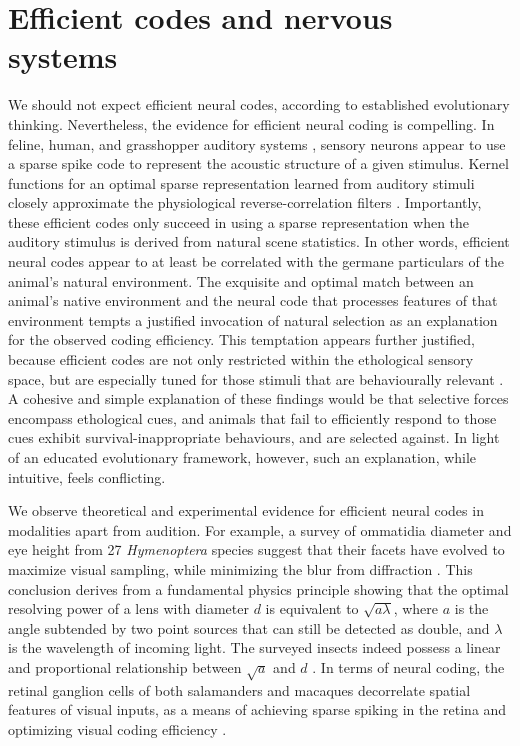 \documentclass{article}
\begin{document}
\section{Efficient codes and nervous systems}

We should not expect efficient neural codes, according to established evolutionary thinking. Nevertheless, the evidence for efficient neural coding is compelling. In feline, human, and grasshopper auditory systems \cite{Machens_Gollisch_Kolesnikova_Herz_2005, smith_lewicki_2006}, sensory neurons appear to use a sparse spike code to represent the acoustic structure of a given stimulus. Kernel functions for an optimal sparse representation learned from auditory stimuli closely approximate the physiological reverse-correlation filters \cite{smith_lewicki_2006}. Importantly, these efficient codes only succeed in using a sparse representation when the auditory stimulus is derived from natural scene statistics. In other words, efficient neural codes appear to at least be correlated with the germane particulars of the animal's natural environment. The exquisite and optimal match between an animal's native environment and the neural code that processes features of that environment tempts a justified invocation of natural selection as an explanation for the observed coding efficiency. This temptation appears further justified, because efficient codes are not only restricted within the ethological sensory space, but are especially tuned for those stimuli that are behaviourally relevant \cite{Machens_Gollisch_Kolesnikova_Herz_2005, machens_herz_2001}. A cohesive and simple explanation of these findings would be that selective forces encompass ethological cues, and animals that fail to efficiently respond to those cues exhibit survival-inappropriate behaviours, and are selected against. In light of an educated evolutionary framework, however, such an explanation, while intuitive, feels conflicting.

We observe theoretical and experimental evidence for efficient neural codes in modalities apart from audition. For example, a survey of ommatidia diameter and eye height from 27 \textit{Hymenoptera} species suggest that their facets have evolved to maximize visual sampling, while minimizing the blur from diffraction \cite{barlow_1952}. This conclusion derives from a fundamental physics principle showing that the optimal resolving power of a lens with diameter $d$ is equivalent to $\sqrt{a \lambda}$, where $a$ is the angle subtended by two point sources that can still be detected as double, and $\lambda$ is the wavelength of incoming light. The surveyed insects indeed possess a linear and proportional relationship between $\sqrt{a}$ and $d$ \cite{barlow_1952}. In terms of neural coding, the retinal ganglion cells of both salamanders and macaques decorrelate spatial features of visual inputs, as a means of achieving sparse spiking in the retina and optimizing visual coding efficiency \cite{Pitkow_Meister_2012}. 
\end{document}
